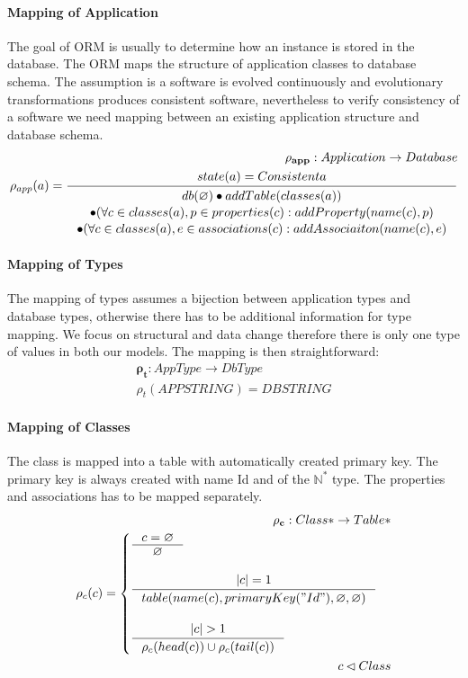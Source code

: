 \documentclass[11pt]{article}
\begin{document}
\paragraph{Mapping of Application} The goal of ORM is usually to determine how an instance is stored in the database. The ORM maps the structure of application classes to database schema. The assumption is a software is evolved continuously and evolutionary transformations produces consistent software, nevertheless to verify consistency of a software we need mapping between an existing application structure and database schema. 
\begin{align*}
	\mathbf{\rho_{app}} : Application \rightarrow Database\\
	\rho_{app}(a) = \inference{state(a) = Consistent a}{\begin{gathered}
	db(\varnothing) \bullet addTable(classes(a)) \\ 
	\bullet (\forall c \in classes(a), p \in properties(c) : addProperty(name(c), p) \\
	\bullet (\forall c \in classes(a), e \in associations(c) : addAssociaiton(name(c), e) 
\end{gathered}}
\end{align*}


\paragraph{Mapping of Types} The mapping of types assumes a bijection between application types and database types, otherwise there has to be additional information for type mapping. We focus on structural and data change therefore there is only one type of values in both our models. The mapping is then straightforward:
\begin{align*}
	\mathbf{\rho_{t}} : AppType \rightarrow DbType  \\
 	\rho_{t}(APPSTRING) = DBSTRING 
\end{align*}

\paragraph{Mapping of Classes} The class is mapped into a table with  automatically created primary key. The primary key is always created with name Id and of the $\mathbb{N^{*}}$ type. The properties and associations has to be mapped separately.
\begin{align*}
	\mathbf{\rho_{c}} : Class*  \rightarrow Table* \\
	\rho_{c}(c) = \begin{cases}
		\inference{c = \varnothing}{\varnothing}\\\\
		\inference{|c| = 1}{table(name(c), primaryKey("Id"), \varnothing, \varnothing)}  \\ \\
		\inference{|c| > 1}{\rho_c(head(c)) \cup \rho_c(tail(c))}
 \end{cases}\\
 c \lhd Class
\end{align*}
\end{document}
